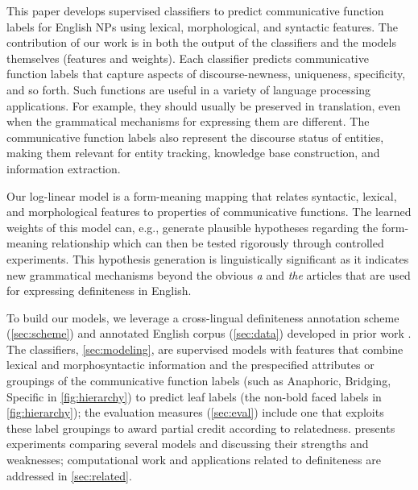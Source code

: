 \documentclass[11pt,letterpaper]{article}
\newcommand{\ensuretext}[1]{#1}
\newcommand{\nssmarker}{\ensuretext{\textcolor{magenta}{\ensuremath{^{\textsc{NS}}_{\textsc{S}}}}}}
\newcommand{\abmarker}{\ensuretext{\textcolor{red}{\ensuremath{^{\textsc{A}}_{\textsc{B}}}}}}
\newcommand{\arkcomment}[3]{\ensuretext{\textcolor{#3}{[#1 #2]}}}
\newcommand{\nss}[1]{\arkcomment{\nssmarker}{#1}{magenta}}
\newcommand{\ab}[1]{\arkcomment{\abmarker}{#1}{red}}
\begin{document}
This paper develops supervised classifiers to predict communicative function labels for English NPs  
using lexical, morphological, and syntactic features.   
The contribution of our work is in both the output of the classifiers and the models themselves (features and weights).  %
Each classifier predicts communicative function labels that capture aspects of discourse-newness, uniqueness, specificity, and so forth. %
Such functions are useful in a variety of language processing applications. For example, they should usually be preserved in translation, even when the grammatical mechanisms 
for expressing them are different. 
The communicative function labels also represent the discourse status of entities, 
making them relevant for entity tracking, knowledge base construction, and information extraction. 

Our log-linear model is a form-meaning mapping that relates syntactic, lexical, and morphological features 
to properties of communicative functions. The learned weights of this model can, e.g., generate plausible hypotheses regarding the form-meaning relationship which can then be tested rigorously through controlled experiments. 
This hypothesis generation is linguistically significant as it indicates new grammatical mechanisms 
beyond the obvious {\em a} and {\em the} articles that are used for expressing definiteness in English. 


To build our models, we leverage a cross-lingual definiteness annotation scheme (\cref{sec:scheme}) 
and annotated English corpus (\cref{sec:data}) developed in prior work \citep{bhatia14}.
The classifiers, \cref{sec:modeling}, are supervised models
with features that combine lexical and morphosyntactic information 
and the prespecified attributes or groupings of the communicative function labels (such as Anaphoric, Bridging, Specific in \cref{fig:hierarchy}) to predict leaf labels (the non-bold faced labels in \cref{fig:hierarchy}); %
the evaluation measures (\cref{sec:eval}) include one that exploits these label groupings 
to award partial credit according to relatedness.
 presents experiments comparing several models and discussing their strengths and weaknesses;
computational work and applications related to definiteness are addressed in \cref{sec:related}.
\end{document}
